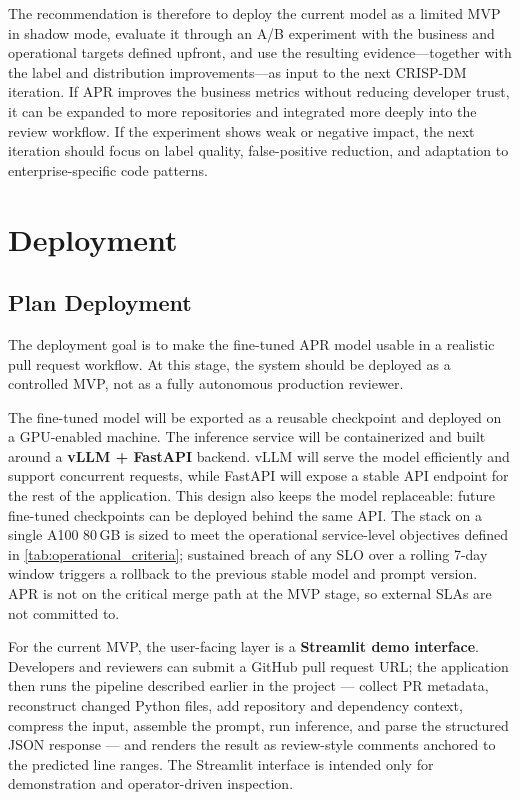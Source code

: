 \documentclass[11pt]{article}
\begin{document}
The recommendation is therefore to deploy the current model as a limited MVP in shadow mode, evaluate it through an A/B experiment with the business and operational targets defined upfront, and use the resulting evidence---together with the label and distribution improvements---as input to the next CRISP-DM iteration. If APR improves the business metrics without reducing developer trust, it can be expanded to more repositories and integrated more deeply into the review workflow. If the experiment shows weak or negative impact, the next iteration should focus on label quality, false-positive reduction, and adaptation to enterprise-specific code patterns.

\section*{Deployment}

\subsection*{Plan Deployment}

The deployment goal is to make the fine-tuned APR model usable in a realistic pull request workflow. At this stage, the system should be deployed as a controlled MVP, not as a fully autonomous production reviewer.

The fine-tuned model will be exported as a reusable checkpoint and deployed on a GPU-enabled machine. The inference service will be containerized and built around a \textbf{vLLM + FastAPI} backend. vLLM will serve the model efficiently and support concurrent requests, while FastAPI will expose a stable API endpoint for the rest of the application. This design also keeps the model replaceable: future fine-tuned checkpoints can be deployed behind the same API. The stack on a single A100 80\,GB is sized to meet the operational service-level objectives defined in \cref{tab:operational_criteria}; sustained breach of any SLO over a rolling 7-day window triggers a rollback to the previous stable model and prompt version. APR is not on the critical merge path at the MVP stage, so external SLAs are not committed to.

For the current MVP, the user-facing layer is a \textbf{Streamlit demo interface}. Developers and reviewers can submit a GitHub pull request URL; the application then runs the pipeline described earlier in the project --- collect PR metadata, reconstruct changed Python files, add repository and dependency context, compress the input, assemble the prompt, run inference, and parse the structured JSON response --- and renders the result as review-style comments anchored to the predicted line ranges. The Streamlit interface is intended only for demonstration and operator-driven inspection.
\end{document}
